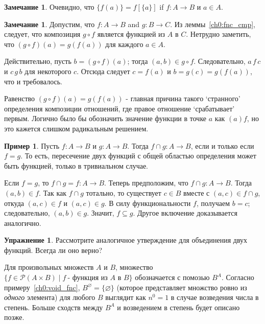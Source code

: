 \documentclass[12pt,notitlepage]{article}
\theoremstyle{plain}
\theoremstyle{definition}
\newtheorem{exc}[thm]{Упражнение}
\newtheorem{exm}[thm]{Пример}
\newtheorem{rem}[thm]{Замечание}
\theoremstyle{plain}
\newcommand{\sbs}{\subseteq}
\newcommand{\void}{\varnothing}
\newcommand{\mP}{\mathcal{P}}
\newcommand{\1}{\mathbf{1}}
\newcommand{\0}{\mathbf{0}}
\newcommand{\mcomm}[1]{}
\begin{document}
\begin{rem}
	Очевидно, что $\{f(a)\} = f[\{a\}]$ if $f\colon A \to B$ и $a \in A$.
\end{rem}

\mcomm{The students may have already defined composition of functions in their calculus course. So, it is important to show them the identity of `our' composition (when restricted to functions) with that of calculus.}
\begin{rem}
	Допустим, что $f\colon A \to B$ and $g\colon B \to C$. Из леммы~\ref{ch0:fnc_cmp}, следует, что композиция $g \circ f$ является функцией из $A$ в $C$. Нетрудно заметить, что $(g\circ f)(a) = g(f(a))$ для каждого $a \in A$.
	
	Действительно, пусть $b = (g \circ f)(a)$; тогда $(a, b) \in g \circ f$. Следовательно, $a\, f\, c$ и $c\, g\, b$ для некоторого $c$. Отсюда следует $c = f(a)$ и $b = g(c) = g (f(a))$, что и требовалось.
	
	Равенство $(g\circ f)(a) = g(f(a))$ - главная причина такого `странного' определения композиции отношений, где правое отношение `срабатывает' первым. Логично было бы обозначить значение функции в точке $a$ как $(a)f$, но это кажется слишком радикальным решением.
\end{rem}

\begin{exm}
	Пусть $f\colon A \to B$ и $g\colon A \to B$. Тогда ${f \cap g}\colon A \to B$, если и только если $f = g$. То есть, пересечение двух функций с общей областью определения может быть функцией, только в тривиальном случае.
	
	Если $f = g$, то $f \cap g = f \colon A \to B$. Теперь предположим, что ${f \cap g}\colon A \to B$. Тогда $(a,b) \in f$. Так как $f \cap g$ тотально, то существует $c \in B$ вместе с $(a,c) \in f \cap g$, откуда $(a,c) \in f$ и $(a,c) \in g$. В силу функциональности $f$, получаем $b = c$; следовательно, $(a,b) \in g$. Значит, $f \sbs g$. Другое включение доказывается аналогично.
\end{exm}

\begin{exc}
	Рассмотрите аналогичное утверждение для объединения двух функций. Всегда ли оно верно?
\end{exc}

Для произвольных множеств $A$ и $B$, множество $\{ f \in \mP(A \times B) \mid f\ \mbox{- функция из $A$ в $B$}\}$ обозначается с помозью $B^A$. Согласно примеру~\ref{ch0:void_fnc}, $B^\void = \{ \void \}$ (которое представляет множство ровно из \emph{одного} элемента) для любого $B$ выглядит как $n^0 = 1$ в случае возведения числа в степень. Больше сходств между $B^A$ и возведением в степень будет описано позже.
\end{document}
